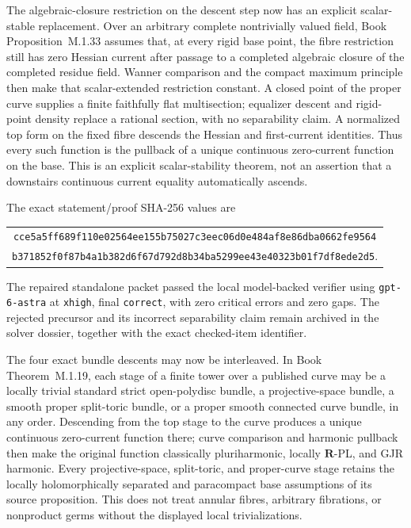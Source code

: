 \documentclass[11pt,a4paper]{article}
\theoremstyle{definition}
\theoremstyle{remark}
\begin{document}
The algebraic-closure restriction on the descent step now has an explicit
scalar-stable replacement.  Over an arbitrary complete nontrivially valued
field, Book Proposition~M.1.33 assumes
that, at every rigid base point, the fibre restriction still has zero
Hessian current after passage to a completed algebraic closure of the
completed residue field.  Wanner comparison and the compact maximum
principle then make that scalar-extended restriction constant.  A closed
point of the proper curve supplies a finite faithfully flat multisection;
equalizer descent and rigid-point density replace a rational section, with
no separability claim.  A normalized top form on the fixed fibre descends
the Hessian and first-current identities.  Thus every such function is the
pullback of a unique continuous zero-current function on the base.  This is
an explicit scalar-stability theorem, not an assertion that a downstairs
continuous current equality automatically ascends.

The exact statement/proof SHA-256 values are
\begin{center}
\small
\begin{tabular}{@{}c@{}}
\nolinkurl{cce5a5ff689f110e02564ee155b75027c3eec06d0e484af8e86dba0662fe9564}\\
\nolinkurl{b371852f0f87b4a1b382d6f67d792d8b34ba5299ee43e40323b01f7df8ede2d5}.
\end{tabular}
\end{center}
The repaired standalone packet passed the local model-backed verifier using
\texttt{gpt-6-astra} at \texttt{xhigh}, final \texttt{correct}, with zero
critical errors and zero gaps.  The rejected precursor and its incorrect
separability claim remain archived in the solver dossier, together with the
exact checked-item identifier.

The four exact bundle descents may now be interleaved.  In
Book Theorem~M.1.19, each stage of a finite
tower over a published curve may be a locally trivial standard strict
open-polydisc bundle, a projective-space bundle, a smooth proper split-toric
bundle, or a proper smooth connected curve bundle, in any order.  Descending
from the top stage to the curve
produces a unique continuous zero-current function there; curve comparison
and harmonic pullback then make the original function classically
pluriharmonic, locally \(\mathbf R\)-PL, and GJR harmonic.  Every
projective-space, split-toric, and proper-curve stage retains the locally
holomorphically separated and paracompact base assumptions of its source
proposition.  This
does not treat annular fibres, arbitrary fibrations, or nonproduct germs
without the displayed local trivializations.
\end{document}
